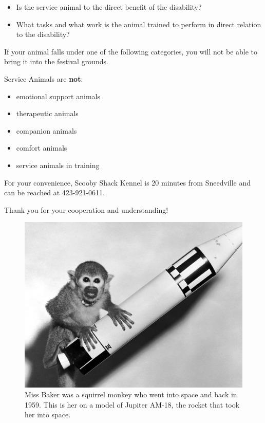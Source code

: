 \begin{itemize}[noitemsep]
\item Is the service animal to the direct benefit of the disability?
\item What tasks and what work is the animal trained to perform in direct relation to the disability? 
\end{itemize}
 
If your animal falls under one of the following categories, you will not be able to bring it into the festival grounds.

Service Animals are \textbf{not}:
\begin{multicols}{2}
\begin{itemize}[noitemsep]
  \item emotional support animals
  \item therapeutic animals
  \item companion animals
  \item comfort animals
  \item service animals in training
\end{itemize}
\end{multicols}

For your convenience, Scooby Shack Kennel is 20 minutes from Sneedville and can be reached at 423-921-0611.

Thank you for your cooperation and understanding!

\begin{figure}[H]
\centering
	\includegraphics[width=.7\textwidth]{images/Baker}
    \caption{Miss Baker was a squirrel monkey who went into space and back in 1959. This is her on a model of Jupiter AM-18, the rocket that took her into space.}
    \label{image:missbaker}
\end{figure}

\clearpage
